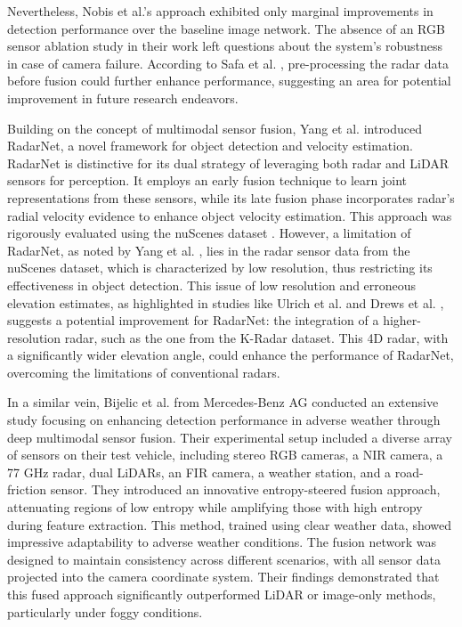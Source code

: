 \documentclass[report.tex]{subfiles}
\begin{document}
    Nevertheless, Nobis et al.'s approach \cite{nobis2019deep} exhibited only marginal improvements in detection performance over the baseline image network. The absence of an RGB sensor ablation study in their work left questions about the system's robustness in case of camera failure. According to Safa et al. \cite{safa2021fail}, pre-processing the radar data before fusion could further enhance performance, suggesting an area for potential improvement in future research endeavors.

    Building on the concept of multimodal sensor fusion, Yang et al. \cite{yang2020radarnet} introduced RadarNet, a novel framework for object detection and velocity estimation. RadarNet is distinctive for its dual strategy of leveraging both radar and LiDAR sensors for perception. It employs an early fusion technique to learn joint representations from these sensors, while its late fusion phase incorporates radar's radial velocity evidence to enhance object velocity estimation. This approach was rigorously evaluated using the nuScenes dataset \cite{caesar2020nuscenes}. However, a limitation of RadarNet, as noted by Yang et al. \cite{yang2020radarnet}, lies in the radar sensor data from the nuScenes dataset, which is characterized by low resolution, thus restricting its effectiveness in object detection. This issue of low resolution and erroneous elevation estimates, as highlighted in studies like Ulrich et al. \cite{ulrich2021deepreflecs} and Drews et al. \cite{drews2022deepfusion}, suggests a potential improvement for RadarNet: the integration of a higher-resolution radar, such as the one from the K-Radar dataset. This 4D radar, with a significantly wider elevation angle, could enhance the performance of RadarNet, overcoming the limitations of conventional radars.

    In a similar vein, Bijelic et al. \cite{bijelic2020seeing} from Mercedes-Benz AG conducted an extensive study focusing on enhancing detection performance in adverse weather through deep multimodal sensor fusion. Their experimental setup included a diverse array of sensors on their test vehicle, including stereo RGB cameras, a NIR camera, a 77 GHz radar, dual LiDARs, an FIR camera, a weather station, and a road-friction sensor. They introduced an innovative entropy-steered fusion approach, attenuating regions of low entropy while amplifying those with high entropy during feature extraction. This method, trained using clear weather data, showed impressive adaptability to adverse weather conditions. The fusion network was designed to maintain consistency across different scenarios, with all sensor data projected into the camera coordinate system. Their findings demonstrated that this fused approach significantly outperformed LiDAR or image-only methods, particularly under foggy conditions.
\end{document}
